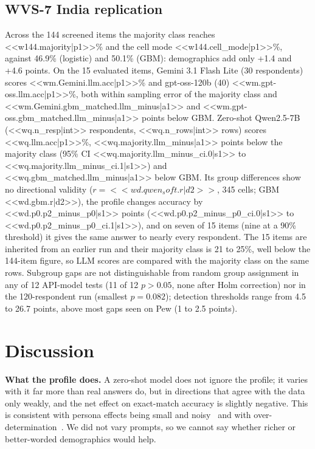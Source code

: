 \documentclass[conference]{IEEEtran}
\begin{document}
\subsection{WVS-7 India replication}

Across the 144 screened items the majority class reaches <<w144.majority|p1>>\% and the cell mode <<w144.cell_mode|p1>>\%, against 46.9\% (logistic) and 50.1\% (GBM): demographics add only +1.4 and +4.6 points. On the 15 evaluated items, Gemini 3.1 Flash Lite (30 respondents) scores <<wm.Gemini.llm.acc|p1>>\% and gpt-oss-120b (40) <<wm.gpt-oss.llm.acc|p1>>\%, both within sampling error of the majority class and <<wm.Gemini.gbm_matched.llm_minus|a1>> and <<wm.gpt-oss.gbm_matched.llm_minus|a1>> points below GBM. Zero-shot Qwen2.5-7B (<<wq.n_resp|int>> respondents, <<wq.n_rows|int>> rows) scores <<wq.llm.acc|p1>>\%, <<wq.majority.llm_minus|a1>> points below the majority class (95\% CI <<wq.majority.llm_minus_ci.0|s1>> to <<wq.majority.llm_minus_ci.1|s1>>) and <<wq.gbm_matched.llm_minus|a1>> below GBM. Its group differences show no directional validity ($r={<<wd.qwen_soft.r|d2>>}$, 345 cells; GBM <<wd.gbm.r|d2>>), the profile changes accuracy by <<wd.p0.p2_minus_p0|s1>> points (<<wd.p0.p2_minus_p0_ci.0|s1>> to <<wd.p0.p2_minus_p0_ci.1|s1>>), and on seven of 15 items (nine at a 90\% threshold) it gives the same answer to nearly every respondent. The 15 items are inherited from an earlier run and their majority class is 21 to 25\%, well below the 144-item figure, so LLM scores are compared with the majority class on the same rows. Subgroup gaps are not distinguishable from random group assignment in any of 12 API-model tests (11 of 12 $p>0.05$, none after Holm correction) nor in the 120-respondent run (smallest $p=0.082$); detection thresholds range from 4.5 to 26.7 points, above most gaps seen on Pew (1 to 2.5 points).

\section{Discussion}

\textbf{What the profile does.} A zero-shot model does not ignore the profile; it varies with it far more than real answers do, but in directions that agree with the data only weakly, and the net effect on exact-match accuracy is slightly negative. This is consistent with persona effects being small and noisy~\cite{hu2024} and with over-determination~\cite{chen2026}. We did not vary prompts, so we cannot say whether richer or better-worded demographics would help.
\end{document}
